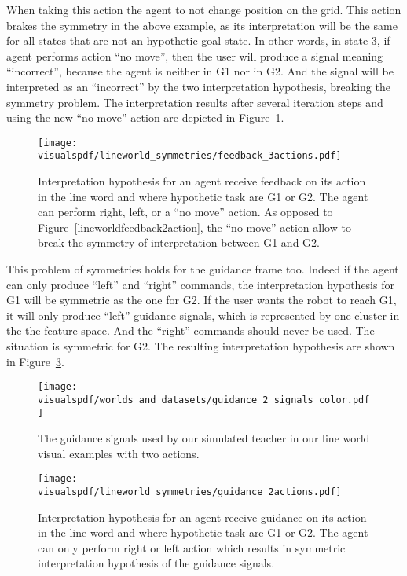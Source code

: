 When taking this action the agent to not change position on the grid. This action brakes the symmetry in the above example, as its interpretation will be the same for all states that are not an hypothetic goal state. In other words, in state 3, if agent performs action ``no move'', then the user will produce a signal meaning ``incorrect'', because the agent is neither in G1 nor in G2. And the signal will be interpreted as an ``incorrect'' by the two interpretation hypothesis, breaking the symmetry problem. The interpretation results after several iteration steps and using the new ``no move'' action are depicted in Figure~\ref{fig:lineworldfeedback3action}.

\begin{figure}[!ht]
  \centering
  \texttt{[image: \\visualspdf/lineworld\_symmetries/feedback\_3actions.pdf]}
  \caption{Interpretation hypothesis for an agent receive feedback on its action in the line word and where hypothetic task are G1 or G2. The agent can perform right, left, or a ``no move'' action. As opposed to Figure~\ref{lineworldfeedback2action}, the ``no move'' action allow to break the symmetry of interpretation between G1 and G2.}
  \label{fig:lineworldfeedback3action}
\end{figure}

This problem of symmetries holds for the guidance frame too. Indeed if the agent can only produce ``left'' and ``right'' commands, the interpretation hypothesis for G1 will be symmetric as the one for G2. If the user wants the robot to reach G1, it will only produce ``left'' guidance signals, which is represented by one cluster in the the feature space. And the ``right'' commands should never be used. The situation is symmetric for G2. The resulting interpretation hypothesis are shown in Figure~\ref{fig:lineworldguidance2action}.

\begin{figure}[!ht]
  \centering
  \texttt{[image: \\visualspdf/worlds\_and\_datasets/guidance\_2\_signals\_color.pdf]}
  \caption{The guidance signals used by our simulated teacher in our line world visual examples with two actions.}
  \label{fig:lineworldguidance2signals}
\end{figure}

\begin{figure}[!ht]
  \centering
  \texttt{[image: \\visualspdf/lineworld\_symmetries/guidance\_2actions.pdf]}
  \caption{Interpretation hypothesis for an agent receive guidance on its action in the line word and where hypothetic task are G1 or G2. The agent can only perform right or left action which results in symmetric interpretation hypothesis of the guidance signals.}
  \label{fig:lineworldguidance2action}
\end{figure}

